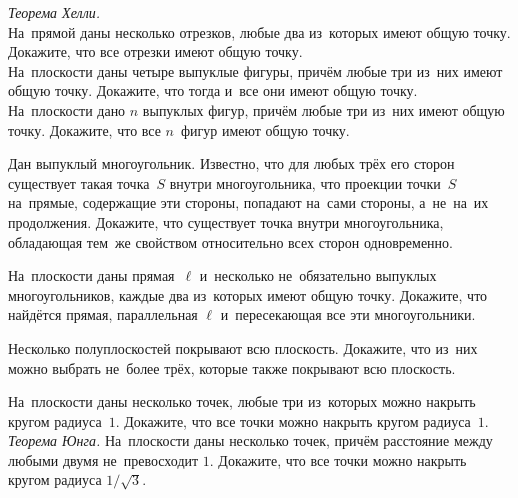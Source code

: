 


\begin{problems}

\item\emph{Теорема Хелли.}
\\
\subproblem
На~прямой даны несколько отрезков, любые два из~которых имеют общую точку.
Докажите, что все отрезки имеют общую точку.
\\
\subproblem
На~плоскости даны четыре выпуклые фигуры, причём любые три из~них имеют общую
точку.
Докажите, что тогда и~все они имеют общую точку.
\\
\subproblem
На~плоскости дано $n$ выпуклых фигур, причём любые три из~них имеют общую
точку.
Докажите, что все $n$~фигур имеют общую точку.

\item
Дан выпуклый многоугольник.
Известно, что для любых трёх его сторон существует такая точка~$S$ внутри
многоугольника, что проекции точки~$S$ на~прямые, содержащие эти стороны,
попадают на~сами стороны, а~не~на~их продолжения.
Докажите, что существует точка внутри многоугольника, обладающая тем~же
свойством относительно всех сторон одновременно.

\item
На~плоскости даны прямая~$\ell$ и~несколько не~обязательно выпуклых
многоугольников, каждые два из~которых имеют общую точку.
Докажите, что найдётся прямая, параллельная $\ell$ и~пересекающая все эти
многоугольники.

\item
Несколько полуплоскостей покрывают всю плоскость.
Докажите, что из~них можно выбрать не~более трёх, которые также покрывают всю
плоскость.

\item
\subproblem
На~плоскости даны несколько точек, любые три из~которых можно накрыть кругом
радиуса~$1$.
Докажите, что все точки можно накрыть кругом радиуса~$1$.
\\
\subproblem
\emph{Теорема Юнга.}
На~плоскости даны несколько точек, причём расстояние между любыми двумя
не~превосходит $1$.
Докажите, что все точки можно накрыть кругом радиуса $1 / \sqrt{3}$.



\end{problems}
